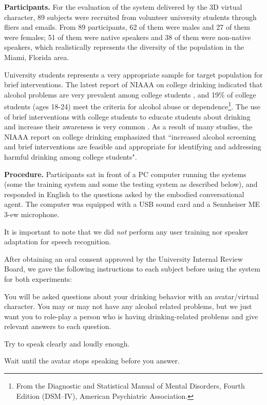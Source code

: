 \documentclass[letterpaper]{article}
\begin{document}
\begin{sloppy}
{\bf Participants.} For the evaluation of the system delivered by the 3D virtual character, 89 subjects were recruited from volunteer university students through fliers and emails.  From 89 participants, 62 of them were males and 27 of them were females; 51 of them were native speakers and 38 of them were non-native speakers,   which realistically represents the diversity of the population in the Miami, Florida area.

University students represents a very appropriate sample for target population for brief interventions. The latest report of NIAAA on college drinking indicated that alcohol problems are very prevalent among college students \cite{NIAAA2007colleges}, and 19\% of college students (ages 18-24) meet the criteria for alcohol abuse or dependence\footnote{From the Diagnostic and Statistical Manual of Mental Disorders, Fourth Edition (DSM–IV), American Psychiatric Association.}. The use of brief interventions with college students to educate students about drinking and  increase their awareness is very common \cite{NIAAA2007colleges}. As a result of many studies, the NIAAA report on college drinking emphasized that ``increased alcohol screening and brief interventions are feasible  and appropriate for identifying and addressing harmful drinking among college students".

{\bf Procedure.} Participants sat in front of a PC computer running the systems (some the training system and some the testing system as described below), and responded in English to the questions asked by the embodied conversational agent.  The computer was equipped with a USB sound card and a Sennheiser ME 3-ew microphone.

It is important to note that we did {\em not} perform any user training nor speaker adaptation for speech recognition. 

After obtaining an oral consent approved by the University Internal Review Board, we gave the following instructions to each subject before using the system for both experiments:
\begin{compactitem}
\item You will be asked questions about your drinking behavior with an avatar/virtual character.  You may or may not have any alcohol related problems, but we just want you to role-play a person who is having drinking-related problems and give relevant answers to each question.
\item Try to speak clearly and loudly enough.
\item Wait until the avatar stops speaking before you answer.
\end{compactitem} 


\end{sloppy}
\end{document}
